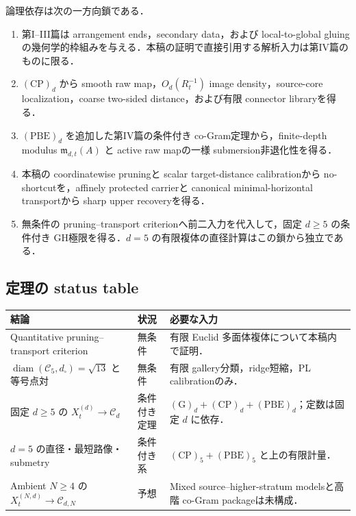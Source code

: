 \documentclass[a4paper,11pt]{ltjsarticle}
\numberwithin{equation}{section}
\theoremstyle{plain}
\theoremstyle{definition}
\theoremstyle{remark}
\newcommand{\cC}{\mathcal C}
\newcommand{\diam}{\operatorname{diam}}
\newcommand{\Cd}{\mathcal C_d}
\newcommand{\Cnd}{\mathcal C_{d,N}}
\begin{document}
論理依存は次の一方向鎖である．
\begin{enumerate}[label=\textup{(R\arabic*)}]
\item 第I--III篇は arrangement ends，secondary data，および local-to-global gluingの幾何学的枠組みを与える．本稿の証明で直接引用する解析入力は第IV篇のものに限る．
\item $\mathrm{(CP)}_d$ から smooth raw map，$O_d(R_t^{-1})$ image density，source-core localization，coarse two-sided distance，および有限 connector libraryを得る．
\item $\mathrm{(PBE)}_d$ を追加した第IV篇の条件付き co-Gram定理から，finite-depth modulus $\mathfrak m_{d,t}(A)$ と active raw mapの一様 submersion非退化性を得る．
\item 本稿の coordinatewise pruningと scalar target-distance calibrationから no-shortcutを，affinely protected carrierと canonical minimal-horizontal transportから sharp upper recoveryを得る．
\item 無条件の pruning--transport criterionへ前二入力を代入して，固定 $d\ge5$ の条件付き GH極限を得る．$d=5$ の有限複体の直径計算はこの鎖から独立である．
\end{enumerate}

\subsection{定理の status table}
\begin{center}
\small
\begin{tabularx}{\textwidth}{@{}p{}p{}X@{}}
\toprule
結論 & 状況 & 必要な入力 \\
\midrule
Quantitative pruning--transport criterion
 & 無条件 & 有限 Euclid 多面体複体について本稿内で証明．\\
$\diam(\cC_5,d_\square)=\sqrt{13}$ と等号点対
 & 無条件 & 有限 gallery分類，ridge短縮，PL calibrationのみ．\\
固定 $d\ge5$ の $X_t^{(d)}\to\Cd$
 & 条件付き定理 & $\mathrm{(G)}_d+\mathrm{(CP)}_d+\mathrm{(PBE)}_d$；定数は固定 $d$ に依存．\\
$d=5$ の直径・最短路像・submetry
 & 条件付き系 & $\mathrm{(CP)}_5+\mathrm{(PBE)}_5$ と上の有限計量．\\
Ambient $N\ge4$ の $X_t^{(N,d)}\to\Cnd$
 & 予想 & Mixed source--higher-stratum modelsと高階 co-Gram packageは未構成．\\
\bottomrule
\end{tabularx}
\end{center}
\end{document}
